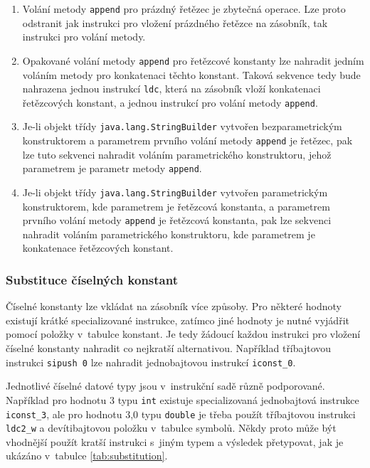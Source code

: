 \begin{enumerate}
\item Volání metody \texttt{append} pro prázdný řetězec je zbytečná operace. Lze proto odstranit jak instrukci pro vložení prázdného řetězce na zásobník, tak instrukci pro volání metody. 

\item Opakované volání metody \texttt{append} pro řetězcové konstanty lze nahradit jedním voláním metody pro konkatenaci těchto konstant. Taková sekvence tedy bude nahrazena jednou instrukcí \texttt{ldc}, která na zásobník vloží konkatenaci řetězcových konstant, a jednou instrukcí pro volání metody \texttt{append}. 

\item Je-li objekt třídy \texttt{java.lang.StringBuilder} vytvořen bezparametrickým konstruktorem a parametrem prvního volání metody \texttt{append} je řetězec, pak lze tuto sekvenci nahradit voláním parametrického konstruktoru, jehož parametrem je parametr metody \texttt{append}.

\item Je-li objekt třídy \texttt{java.lang.StringBuilder} vytvořen parametrickým konstruktorem, kde parametrem je řetězcová konstanta, a parametrem prvního volání metody \texttt{append} je řetězcová konstanta, pak lze sekvenci nahradit voláním parametrického konstruktoru, kde parametrem je konkatenace řetězcových konstant.
\end{enumerate}

\subsubsection{Substituce číselných konstant}

Číselné konstanty lze vkládat na zásobník více způsoby. Pro některé hodnoty existují krátké specializované instrukce, zatímco jiné hodnoty je nutné vyjádřit pomocí položky v~tabulce konstant. Je tedy žádoucí každou instrukci pro vložení číselné konstanty nahradit co nejkratší alternativou. Například tříbajtovou instrukci \texttt{sipush 0} lze nahradit jednobajtovou instrukcí \texttt{iconst\_0}.

Jednotlivé číselné datové typy jsou v~instrukční sadě různě podporované. Například pro hodnotu 3 typu \texttt{int} existuje specializovaná jednobajtová instrukce \texttt{iconst\_3}, ale pro hodnotu 3,0 typu \texttt{double} je třeba použít tříbajtovou instrukci \texttt{ldc2\_w} a devítibajtovou položku v~tabulce symbolů. Někdy proto může být vhodnější použít kratší instrukci s~jiným typem a výsledek přetypovat, jak je ukázáno v~tabulce \ref{tab:substitution}. 

